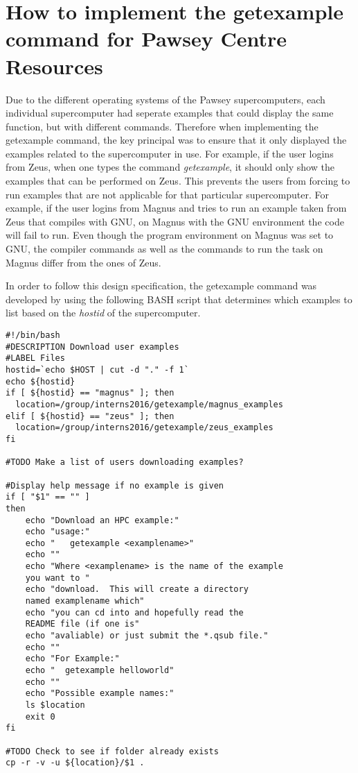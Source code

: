 \section{How to implement the getexample command for Pawsey Centre Resources}

Due to the different operating systems of the Pawsey supercomputers, each individual supercomputer had seperate examples that could display the same
function, but with different commands. Therefore when implementing the getexample command, the key principal was to ensure that it only displayed the
examples related to the supercomputer in use. For example, if the user logins from Zeus, when one types the command \emph{getexample}, it should only
show the examples that can be performed on Zeus. This prevents the users from forcing to run examples that are not applicable for that particular 
supercomputer. For example, if the user logins from Magnus and tries to run an example taken from Zeus that compiles with GNU, on Magnus with the GNU 
environment the code will fail to run. Even though the program environment on Magnus was set to GNU, the compiler commands as well as the commands to
run the task on Magnus differ from the ones of Zeus.

In order to follow this design specification, the getexample command was developed by using the following BASH script that determines which examples to
list based on the \emph{hostid} of the supercomputer.    


\begin{tcolorbox}
\begin{Verbatim}[fontsize=\scriptsize]
#!/bin/bash
#DESCRIPTION Download user examples
#LABEL Files
hostid=`echo $HOST | cut -d "." -f 1`
echo ${hostid}
if [ ${hostid} == "magnus" ]; then 
  location=/group/interns2016/getexample/magnus_examples
elif [ ${hostid} == "zeus" ]; then
  location=/group/interns2016/getexample/zeus_examples
fi

#TODO Make a list of users downloading examples?

#Display help message if no example is given
if [ "$1" == "" ]
then
    echo "Download an HPC example:"
    echo "usage:"
    echo "   getexample <examplename>"
    echo ""
    echo "Where <examplename> is the name of the example 
    you want to "
    echo "download.  This will create a directory 
    named examplename which"
    echo "you can cd into and hopefully read the 
    README file (if one is"
    echo "avaliable) or just submit the *.qsub file."
    echo ""
    echo "For Example:"
    echo "  getexample helloworld"
    echo ""
    echo "Possible example names:"
    ls $location 
    exit 0
fi

#TODO Check to see if folder already exists
cp -r -v -u ${location}/$1 .
\end{Verbatim}
\end{tcolorbox}
